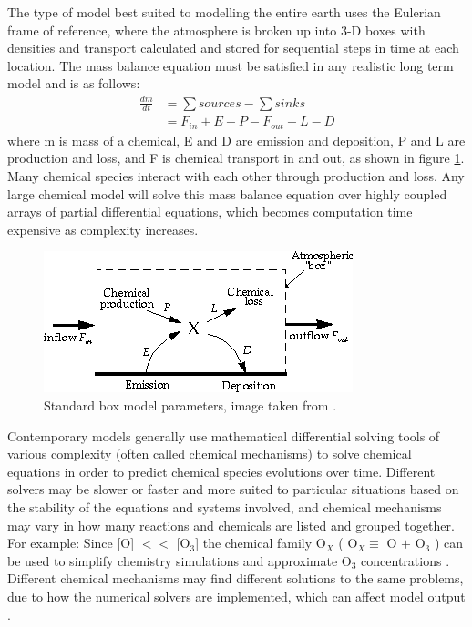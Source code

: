     
    The type of model best suited to modelling the entire earth uses the Eulerian frame of reference, where the atmosphere is broken up into 3-D boxes with densities and transport calculated and stored for sequential steps in time at each location.
    The mass balance equation must be satisfied in any realistic long term model and is as follows: 
    \begin{align*}
      \frac{dm}{dt} & = \sum{sources}-\sum{sinks} \\
                    & = F_{in} + E + P - F_{out} - L - D 
    \end{align*}
    where m is mass of a chemical, E and D are emission and deposition, P and L are production and loss, and F is chemical transport in and out, as shown in figure \ref{LR:Models:fig_boxmodel}.
    Many chemical species interact with each other through production and loss. 
    Any large chemical model will solve this mass balance equation over highly coupled arrays of partial differential equations, which becomes computation time expensive as complexity increases.
    
    \begin{figure}
      \includegraphics{Figures/boxmodel.png}
      \caption{ %
        Standard box model parameters, image taken from \textcite{Jacob_1999_book}. }
      \label{LR:Models:fig_boxmodel}
    \end{figure}
    
    Contemporary models generally use mathematical differential solving tools of various complexity (often called chemical mechanisms) to solve chemical equations in order to predict chemical species evolutions over time.
    Different solvers may be slower or faster and more suited to particular situations based on the stability of the equations and systems involved, and chemical mechanisms may vary in how many reactions and chemicals are listed and grouped together.
    For example: Since [O] $<<$ [O$_3$] the chemical family O$_X$ (  O$_X \equiv $ O $+$ O$_3$ ) can be used to simplify chemistry simulations and approximate O$_3$ concentrations \parencite[][Chapter 3]{BrasseurJacob2017}.
    Different chemical mechanisms may find different solutions to the same problems, due to how the numerical solvers are implemented, which can affect model output \parencite{Zhang2012}.
    
